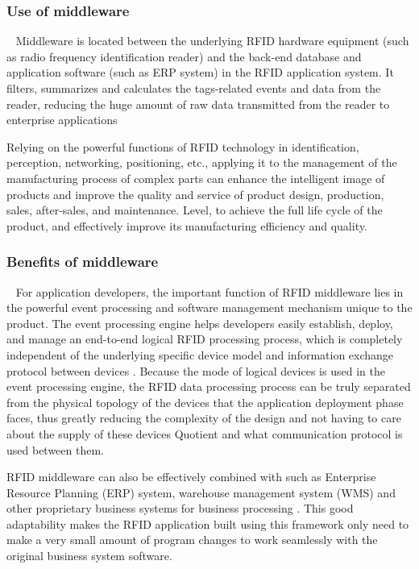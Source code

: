 \documentclass[conference]{IEEEtran}
\begin{document}
\subsubsection{Use of middleware}
\
\newline
\indent
Middleware is located between the underlying RFID hardware equipment (such as radio frequency identification reader) and the back-end database and application software (such as ERP system) in the RFID application system. It filters, summarizes and calculates the tags-related events and data from the reader, reducing the huge amount of raw data transmitted from the reader to enterprise applications

Relying on the powerful functions of RFID technology in identification, perception, networking, positioning, etc., applying it to the management of the manufacturing process of complex parts can enhance the intelligent image of products and improve the quality and service of product design, production, sales, after-sales, and maintenance. Level, to achieve the full life cycle of the product, and effectively improve its manufacturing efficiency and quality.

\subsubsection{Benefits of middleware}
\
\newline
\indent
For application developers, the important function of RFID middleware lies in the powerful event processing and software management mechanism unique to the product. The event processing engine helps developers easily establish, deploy, and manage an end-to-end logical RFID processing process, which is completely independent of the underlying specific device model and information exchange protocol between devices \cite{b13}. Because the mode of logical devices is used in the event processing engine, the RFID data processing process can be truly separated from the physical topology of the devices that the application deployment phase faces, thus greatly reducing the complexity of the design and not having to care about the supply of these devices Quotient and what communication protocol is used between them.

RFID middleware can also be effectively combined with such as Enterprise Resource Planning (ERP) system, warehouse management system (WMS) and other proprietary business systems for business processing \cite{b15}. This good adaptability makes the RFID application built using this framework only need to make a very small amount of program changes to work seamlessly with the original business system software.
\end{document}
